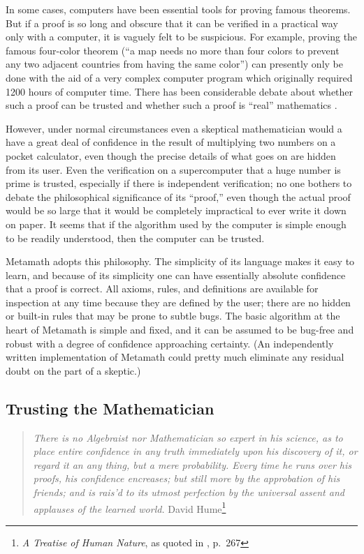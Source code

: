In some cases, computers have been essential tools for proving famous
theorems.  But if a proof is so long and obscure that it can be verified in a
practical way only with a computer, it is vaguely felt to be suspicious.  For
example, proving the famous four-color theorem (``a map needs no more than four colors to
prevent any two adjacent countries from having the same color'') can presently
only be done with the aid of a very complex computer program which originally
required 1200 hours of computer time. There has been considerable debate about
whether such a proof can be trusted and whether such a proof is ``real''
mathematics \cite{Swart}.

However, under normal circumstances even a skeptical mathematician would a have
a great deal of confidence in the result of multiplying two numbers on a pocket
calculator, even though the precise details of what goes on are hidden from its
user.  Even the verification on a supercomputer that a huge number is prime is
trusted, especially if there is independent verification; no one bothers to
debate the philosophical significance of its ``proof,'' even though the actual
proof would be so large that it would be completely impractical to ever write
it down on paper.  It seems that if the algorithm used by the computer is
simple enough to be readily understood, then the computer can be trusted.

Metamath adopts this philosophy.  The simplicity of its
language makes it easy to learn, and because of its simplicity one can have
essentially absolute confidence that a proof is correct. All axioms, rules, and
definitions are available for inspection at any time because they are defined
by the user; there are no hidden or built-in rules that may be prone to subtle
bugs.  The basic algorithm at the heart of
Metamath is simple and fixed, and it can be assumed to be bug-free and robust
with a degree of confidence approaching certainty.  (An independently written
implementation of Metamath could pretty much eliminate any residual doubt on
the part of a skeptic.)

\subsection{Trusting the Mathematician}\label{trust}

\begin{quote}
  {\em There is no Algebraist nor Mathematician so expert in his science, as
  to place entire confidence in any truth immediately upon his discovery of it,
  or regard it an any thing, but a mere probability.  Every time he runs over
  his proofs, his confidence encreases; but still more by the approbation of
  his friends; and is rais'd to its utmost perfection by the universal assent
  and applauses of the learned world.}
  \flushright\sc David Hume\footnote{{\em A Treatise of Human Nature}, as
  quoted in \cite{deMillo}, p.~267}\\
\end{quote}

